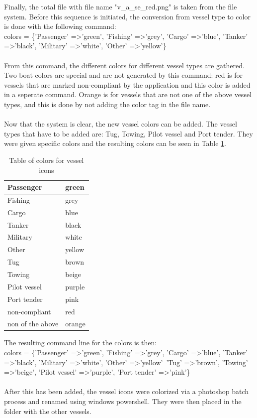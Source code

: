\documentclass[12pt]{article}
\begin{document}
Finally, the total file with file name "v\_a\_se\_red.png" is taken from the file system. Before this sequence is initiated, the conversion from vessel type to color is done with the following command:
\\
    colors = \{'Passenger' =\textgreater 'green', 'Fishing' =\textgreater 'grey', 'Cargo' =\textgreater 'blue', 'Tanker' =\textgreater 'black', 'Military' =\textgreater 'white', 'Other' =\textgreater 'yellow'\}
\\
\\
From this command, the different colors for different vessel types are gathered. Two boat colors are special and are not generated by this command: red is for vessels that are marked non-compliant by the application and this color is added in a seperate command. Orange is for vessels that are not one of the above vessel types, and this is done by not adding the color tag in the file name.
\\
\\
Now that the system is clear, the new vessel colors can be added. The vessel types that have to be added are: Tug, Towing, Pilot vessel and Port tender. They were given specific colors and the resulting colors can be seen in Table \ref{colortable}.
\\

\begin{table}
\centering

\begin{tabular}{|l|l|}
	\hline
	Passenger & green \\
	\hline
	Fishing & grey \\
	\hline
	Cargo & blue \\
	\hline
	Tanker & black \\
	\hline
	Military & white \\
	\hline
	Other & yellow \\
	\hline
	Tug & brown \\
	\hline
	Towing & beige \\
	\hline
	Pilot vessel & purple \\
	\hline
	Port tender & pink \\
	\hline
	non-compliant & red \\
	\hline
	non of the above & orange \\
	\hline
\end{tabular}
\caption{Table of colors for vessel icons}
\label{colortable}
\end{table}

The resulting command line for the colors is then:
\\
    colors = \{'Passenger' =\textgreater 'green', 'Fishing' =\textgreater 'grey', 'Cargo' =\textgreater 'blue', 'Tanker' =\textgreater 'black', 'Military' =\textgreater 'white', 'Other' =\textgreater 'yellow'\, 'Tug' =\textgreater 'brown', 'Towing' =\textgreater 'beige', 'Pilot vessel' =\textgreater 'purple', 'Port tender' =\textgreater 'pink'\}
\\
\\
After this has been added, the vessel icons were colorized via a photoshop batch process and renamed using windows powershell. They were then placed in the folder with the other vessels.
	
\end{document}
